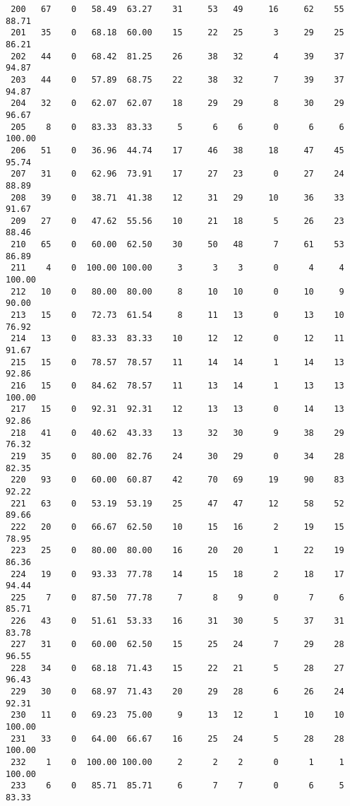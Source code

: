 \begin{verbatim}
 200   67    0   58.49  63.27    31     53   49     16     62    55    88.71
 201   35    0   68.18  60.00    15     22   25      3     29    25    86.21
 202   44    0   68.42  81.25    26     38   32      4     39    37    94.87
 203   44    0   57.89  68.75    22     38   32      7     39    37    94.87
 204   32    0   62.07  62.07    18     29   29      8     30    29    96.67
 205    8    0   83.33  83.33     5      6    6      0      6     6   100.00
 206   51    0   36.96  44.74    17     46   38     18     47    45    95.74
 207   31    0   62.96  73.91    17     27   23      0     27    24    88.89
 208   39    0   38.71  41.38    12     31   29     10     36    33    91.67
 209   27    0   47.62  55.56    10     21   18      5     26    23    88.46
 210   65    0   60.00  62.50    30     50   48      7     61    53    86.89
 211    4    0  100.00 100.00     3      3    3      0      4     4   100.00
 212   10    0   80.00  80.00     8     10   10      0     10     9    90.00
 213   15    0   72.73  61.54     8     11   13      0     13    10    76.92
 214   13    0   83.33  83.33    10     12   12      0     12    11    91.67
 215   15    0   78.57  78.57    11     14   14      1     14    13    92.86
 216   15    0   84.62  78.57    11     13   14      1     13    13   100.00
 217   15    0   92.31  92.31    12     13   13      0     14    13    92.86
 218   41    0   40.62  43.33    13     32   30      9     38    29    76.32
 219   35    0   80.00  82.76    24     30   29      0     34    28    82.35
 220   93    0   60.00  60.87    42     70   69     19     90    83    92.22
 221   63    0   53.19  53.19    25     47   47     12     58    52    89.66
 222   20    0   66.67  62.50    10     15   16      2     19    15    78.95
 223   25    0   80.00  80.00    16     20   20      1     22    19    86.36
 224   19    0   93.33  77.78    14     15   18      2     18    17    94.44
 225    7    0   87.50  77.78     7      8    9      0      7     6    85.71
 226   43    0   51.61  53.33    16     31   30      5     37    31    83.78
 227   31    0   60.00  62.50    15     25   24      7     29    28    96.55
 228   34    0   68.18  71.43    15     22   21      5     28    27    96.43
 229   30    0   68.97  71.43    20     29   28      6     26    24    92.31
 230   11    0   69.23  75.00     9     13   12      1     10    10   100.00
 231   33    0   64.00  66.67    16     25   24      5     28    28   100.00
 232    1    0  100.00 100.00     2      2    2      0      1     1   100.00
 233    6    0   85.71  85.71     6      7    7      0      6     5    83.33

\end{verbatim}
